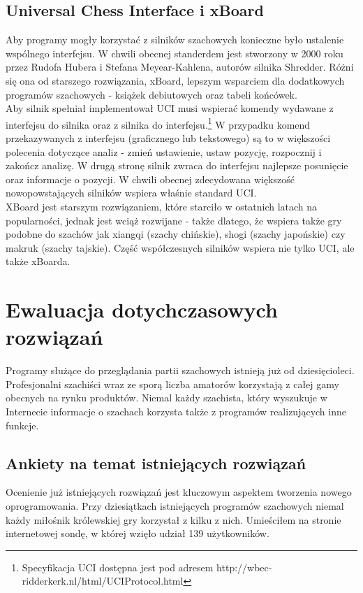 \documentclass[12pt,leqno]{article}
\begin{document}
\subsection{Universal Chess Interface i xBoard}
Aby programy mogły korzystać z silników szachowych konieczne było ustalenie wspólnego interfejsu. W chwili obecnej standerdem jest stworzony w 2000 roku przez Rudofa Hubera i Stefana Meyear-Kahlena, autorów silnika Shredder. Różni się ona od starszego rozwiązania, xBoard, lepszym wsparciem dla dodatkowych programów szachowych - książek debiutowych oraz tabeli końcówek.\\
Aby silnik spełniał implementował UCI musi wspierać komendy wydawane z  interfejsu do silnika oraz z silnika do interfejsu.\footnote{Specyfikacja UCI dostępna jest pod adresem http://wbec-ridderkerk.nl/html/UCIProtocol.html} W przypadku komend przekazywanych z interfejsu (graficznego lub tekstowego) są to w większości polecenia dotyczące analiz - zmień ustawienie, ustaw pozycję, rozpocznij i zakończ analizę. W drugą stronę silnik zwraca do interfejsu najlepsze posunięcie oraz informacje o pozycji. W chwili obecnej zdecydowana większość nowopowstających silników wspiera właśnie standard UCI. \\
XBoard jest starszym rozwiązaniem, które starciło w ostatnich latach na popularności, jednak jest wciąż rozwijane - także dlatego, że wspiera także gry podobne do szachów jak xiangqi (szachy chińskie), shogi (szachy japońskie) czy makruk (szachy tajskie). Część współczesnych silników wspiera nie tylko UCI, ale także xBoarda. 



\newpage
\section{Ewaluacja dotychczasowych rozwiązań}
Programy służące do przeglądania partii szachowych istnieją już od dziesięcioleci. Profesjonalni szachiści wraz ze sporą liczba amatorów korzystają z całej gamy obecnych na rynku produktów. Niemal każdy szachista, który wyszukuje w Internecie  informacje o szachach korzysta także z programów realizujących inne funkcje. 

\subsection{Ankiety na temat istniejących rozwiązań}
Ocenienie już istniejących rozwiązań jest kluczowym aspektem tworzenia nowego oprogramowania. Przy dziesiątkach istniejących programów szachowych niemal każdy miłośnik królewskiej gry korzystał z kilku z nich. Umieściłem na stronie internetowej sondę, w której wzięło udział 139 użytkowników.\\
\end{document}
